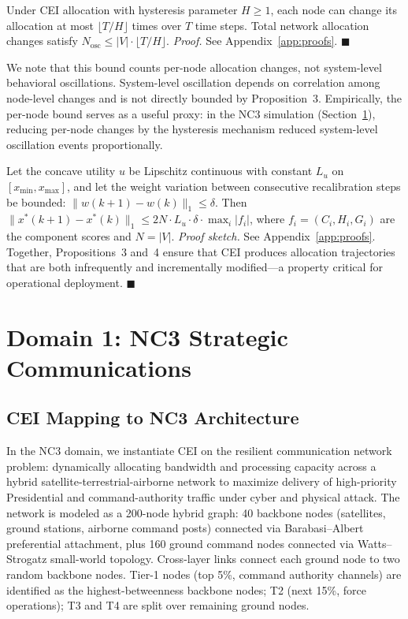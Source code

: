 \documentclass[runningheads]{llncs}
\begin{document}
\begin{proposition}
Under CEI allocation with hysteresis parameter $H \geq 1$, each node can change its allocation at most $\lfloor T/H \rfloor$ times over $T$ time steps. Total network allocation changes satisfy $N_{\text{osc}} \leq |V| \cdot \lfloor T/H \rfloor$. \emph{Proof.} See Appendix~\ref{app:proofs}. $\blacksquare$
\end{proposition}

We note that this bound counts per-node allocation changes, not system-level behavioral oscillations. System-level oscillation depends on correlation among node-level changes and is not directly bounded by Proposition~3. Empirically, the per-node bound serves as a useful proxy: in the NC3 simulation (Section~\ref{sec:nc3}), reducing per-node changes by the hysteresis mechanism reduced system-level oscillation events proportionally.

\begin{proposition}
Let the concave utility $u$ be Lipschitz continuous with constant $L_u$ on $[x_{\min}, x_{\max}]$, and let the weight variation between consecutive recalibration steps be bounded: $\|w(k+1) - w(k)\|_1 \leq \delta$. Then $\|x^*(k+1) - x^*(k)\|_1 \leq 2N \cdot L_u \cdot \delta \cdot \max_i |f_i|$, where $f_i = (C_i, H_i, G_i)$ are the component scores and $N = |V|$. \emph{Proof sketch.} See Appendix~\ref{app:proofs}. Together, Propositions~3 and~4 ensure that CEI produces allocation trajectories that are both infrequently and incrementally modified---a property critical for operational deployment. $\blacksquare$
\end{proposition}


\section{Domain 1: NC3 Strategic Communications}
\label{sec:nc3}

\subsection{CEI Mapping to NC3 Architecture}

In the NC3 domain, we instantiate CEI on the resilient communication network problem: dynamically allocating bandwidth and processing capacity across a hybrid satellite-terrestrial-airborne network to maximize delivery of high-priority Presidential and command-authority traffic under cyber and physical attack. The network is modeled as a 200-node hybrid graph: 40 backbone nodes (satellites, ground stations, airborne command posts) connected via Barabasi--Albert preferential attachment, plus 160 ground command nodes connected via Watts--Strogatz small-world topology. Cross-layer links connect each ground node to two random backbone nodes. Tier-1 nodes (top 5\%, command authority channels) are identified as the highest-betweenness backbone nodes; T2 (next 15\%, force operations); T3 and T4 are split over remaining ground nodes.
\end{document}
